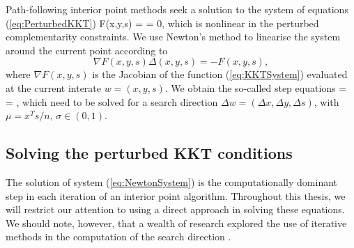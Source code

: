 Path-following interior point methods seek a solution 
to the system of equations (\ref{eq:PerturbedKKT})
\be  \label{eq:KKTSystem}
F(x,y,s) =  = 0,
\ee
which is nonlinear in the perturbed complementarity constraints.
We use Newton's method to linearise the system around the 
current point according to
\[
\nabla F(x,y,s) \Delta(x,y,s) = -F(x,y,s),
\]
where $\nabla F(x,y,s)$ is the Jacobian of the function (\ref{eq:KKTSystem})
evaluated at the current interate $w = (x,y,s)$.
We obtain the so-called step equations
%
\be \label{eq:NewtonSystem}
 =
 =
\left[ \begin{array}{c}
    \xi_b \\ \xi_c \\ \xi_\mu
   \end{array} \right],
\ee
%
which need to be solved for a search direction
$\Delta w = (\Delta x, \Delta y, \Delta s)$,
with $\mu = x^Ts/n$, $\sigma \in (0,1)$.

%
%
\subsection{Solving the perturbed KKT conditions}

The solution of system (\ref{eq:NewtonSystem}) is the computationally
dominant step in each iteration of an interior point algorithm.
Throughout this thesis, we will 
restrict our attention to using a direct approach in solving these
equations.
We should note, however, that a wealth of research explored the use
of iterative methods in the computation of the search direction
\cite{BergamaschiGondzioZilli,OliveiraSorensen05}.


